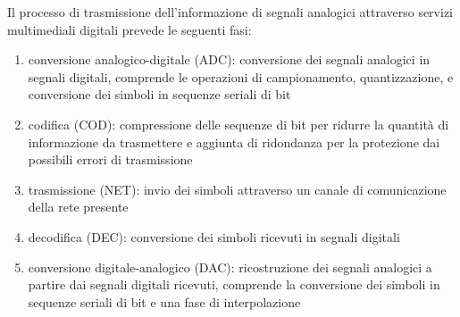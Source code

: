 \begin{figure}[htbp]
\end{figure}

\noindent
Il processo di trasmissione dell'informazione di segnali analogici attraverso servizi multimediali digitali prevede le
seguenti fasi:
\begin{enumerate}
	\item conversione analogico-digitale (ADC): conversione dei segnali analogici in segnali digitali, comprende le
	operazioni di campionamento, quantizzazione, e conversione dei simboli in sequenze seriali di bit
	\item codifica (COD): compressione delle sequenze di bit per ridurre la quantità di informazione da trasmettere
	e aggiunta di ridondanza per la protezione dai possibili errori di trasmissione
	\item trasmissione (NET): invio dei simboli attraverso un canale di comunicazione della rete presente
	\item decodifica (DEC): conversione dei simboli ricevuti in segnali digitali
	\item conversione digitale-analogico (DAC): ricostruzione dei segnali analogici a partire dai segnali digitali
	ricevuti, comprende la conversione dei simboli in sequenze seriali di bit e una fase di interpolazione
\end{enumerate}

